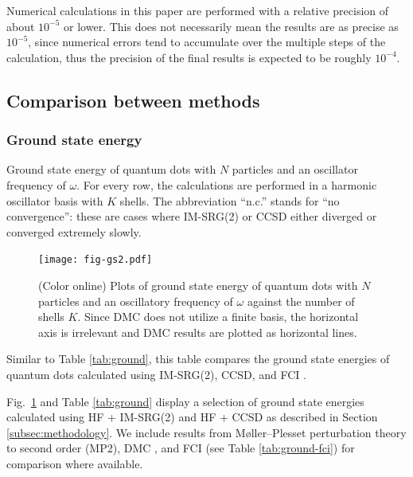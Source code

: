 \documentclass[aip, jcp, 12pt]{revtex4-1}
\begin{document}
Numerical calculations in this paper are performed with a relative precision of about $10^{-5}$ or lower.  This does not necessarily mean the results are as precise as $10^{-5}$, since numerical errors tend to accumulate over the multiple steps of the calculation, thus the precision of the final results is expected to be roughly $10^{-4}$.

\subsection{Comparison between methods}

\subsubsection{Ground state energy}

\begin{table}
  \centering
  \caption{Ground state energy of quantum dots with $N$ particles and an oscillator frequency of $\omega$.  For every row, the calculations are performed in a harmonic oscillator basis with $K$ shells.  The abbreviation ``n.c.'' stands for ``no convergence'': these are cases where IM-SRG(2) or CCSD either diverged or converged extremely slowly.}
  \label{tab:ground}
  \unskip
\end{table}

\begin{figure}
  \centering
  \texttt{[image: fig-gs2.pdf]}
  \caption{(Color online) Plots of ground state energy of quantum dots with $N$ particles and an oscillatory frequency of $\omega$ against the number of shells $K$.  Since DMC does not utilize a finite basis, the horizontal axis is irrelevant and DMC results are plotted as horizontal lines.}
  \label{fig:gs}
\end{figure}

\begin{table}
  \centering
  \caption{Similar to Table \ref{tab:ground}, this table compares the ground state energies of quantum dots calculated using IM-SRG(2), CCSD, and FCI \cite{olsen2013thesis}.}
  \label{tab:ground-fci}
  \unskip
\end{table}

Fig.\ \ref{fig:gs} and Table \ref{tab:ground} display a selection of ground state energies calculated using HF + IM-SRG(2) and HF + CCSD as described in Section \ref{subsec:methodology}.  We include results from M\o ller--Plesset perturbation theory to second order (MP2), DMC \cite{hoegberget2013thesis}, and FCI \cite{olsen2013thesis} (see Table \ref{tab:ground-fci}) for comparison where available.
\end{document}

